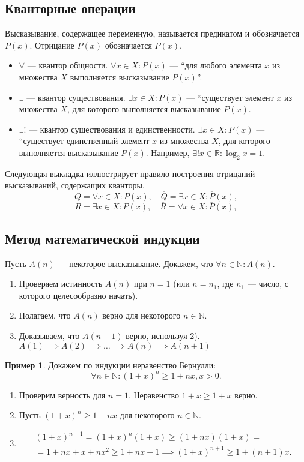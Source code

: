 \documentclass[a4paper,12pt]{article} %
\theoremstyle{remark}
\theoremstyle{definition}
\newtheorem{exmp}{Пример}[section]
\begin{document}
\subsection{Кванторные операции}

Высказывание, содержащее переменную, называется предикатом и обозначается $P(x)$. Отрицание $P(x)$ обозначается $\overline{P}(x)$.

\begin{itemize}
	\item $\forall $ --- квантор общности. $\forall x \in X : P(x)$ --- ``для любого элемента $x$ из множества $X$ выполняется высказывание $P(x)$''.
	\item $\exists $ --- квантор существования. $\exists x \in X : P(x)$ --- ``существует элемент $x$ из множества $X$, для которого выполняется высказывание $P(x)$.
	\item $\exists !$ --- квантор существования и единственности. $\exists x \in X : P(x)$ --- ``существует единственный элемент $x$ из множества $X$, для которого выполняется высказывание $P(x)$. Например, $\exists ! x \in \mathbb{R} : \log_2 x = 1$.
\end{itemize}

Следующая выкладка иллюстрирует правило построения отрицаний высказываний, содержащих кванторы.
\[
Q = \forall x \in X : P(x), \quad \overline{Q} = \exists x \in X : \overline{P}(x)
,\] 
\[
R = \exists x \in X : P(x), \quad \overline{R} = \forall x \in X : \overline{P}(x)
,\] 
\subsection{Метод математической индукции}
Пусть $A(n)$ --- некоторое высказывание. Докажем, что $\forall n\in \mathbb{N} : A(n)$.
\begin{enumerate}
	\item Проверяем истинность $A(n)$ при $n=1$ (или $n=n_1$, где $n_1$ --- число, с которого целесообразно начать).
	\item Полагаем, что $A(n)$ верно для некоторого $n\in \mathbb{N}$.
	\item Доказываем, что $A(n+1)$ верно, используя 2). $A(1) \implies A(2) \implies \ldots \implies A(n) \implies A(n+1)$ 
\end{enumerate}

\begin{exmp}
	Докажем по индукции неравенство Бернулли:
\[
\forall n \in  \mathbb{N} : (1+x)^{n} \ge  1 + nx, x > 0
.\] 
\begin{enumerate}
	\item Проверим верность для $n = 1$. Неравенство $1 + x \ge  1 + x$ верно.
	\item Пусть $(1+x)^{n} \ge  1 + nx$ для некоторого $n \in \mathbb{N}$.
	\item \begin{multline}
		(1+x)^{n+1} = (1+x)^{n}(1+x) \ge (1+nx)(1+x) = \\
		= 1 + nx + x + nx^2 \ge 1 + nx + 1 \implies (1+x)^{n+1} \ge  1 + (n+1)x. 	
		\end{multline}
\end{enumerate}

\end{exmp}
\newpage
\end{document}
